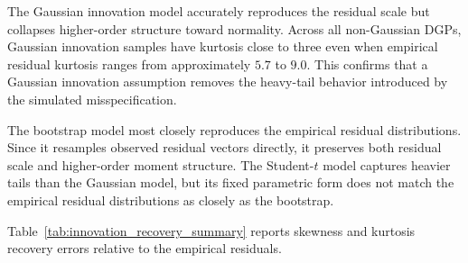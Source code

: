 \documentclass[11pt]{article}
\begin{document}
The Gaussian innovation model accurately reproduces the residual scale but collapses higher-order structure toward normality. Across all non-Gaussian DGPs, Gaussian innovation samples have kurtosis close to three even when empirical residual kurtosis ranges from approximately \(5.7\) to \(9.0\). This confirms that a Gaussian innovation assumption removes the heavy-tail behavior introduced by the simulated misspecification.

The bootstrap model most closely reproduces the empirical residual distributions. Since it resamples observed residual vectors directly, it preserves both residual scale and higher-order moment structure. The Student-\(t\) model captures heavier tails than the Gaussian model, but its fixed parametric form does not match the empirical residual distributions as closely as the bootstrap.

Table~\ref{tab:innovation_recovery_summary} reports skewness and kurtosis recovery errors relative to the empirical residuals.
\end{document}
